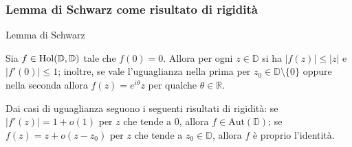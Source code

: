 \begin{frame}
  \frametitle{Lemma di Schwarz come risultato di rigidità}
  \begin{block}{Lemma di Schwarz}
    \begin{itshape}
      Sia $f \in \text{\normalfont{Hol}}(\mathbb{D},\mathbb{D})$ tale che $f(0)=0$. Allora per ogni $z \in \mathbb{D}$ si ha $|f(z)| \le |z|$ e $|f'(0)| \le 1$; inoltre, se vale l'uguaglianza nella prima per $z_0 \in \mathbb{D}\setminus\{0\}$ oppure nella seconda allora $f(z)=e^{i\theta}z$ per qualche $\theta \in \mathbb{R}$.
    \end{itshape}
  \end{block}
  \pause
  \begin{oss}
    Dai casi di uguaglianza seguono i seguenti risultati di rigidità: se $|f'(z)|=1+o(1)$ per $z$ che tende a $0$, allora $f \in \text{Aut}(\mathbb{D})$; se $f(z)=z+o(z-z_0)$ per $z$ che tende a $z_0 \in \mathbb{D}$, allora $f$ è proprio l'identità.
  \end{oss}
\end{frame}

